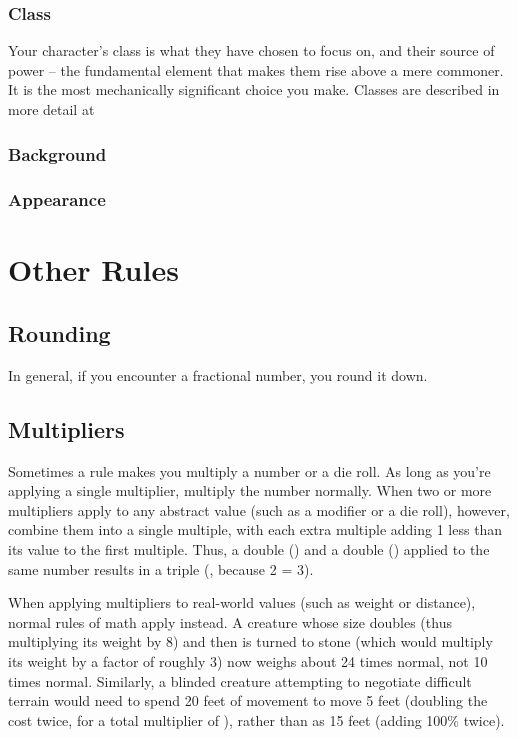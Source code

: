 \subsubsection{Class}
Your character's class is what they have chosen to focus on, and their source of power -- the fundamental element that makes them rise above a mere commoner.
It is the most mechanically significant choice you make.
Classes are described in more detail at 

\subsubsection{Background}

\subsubsection{Appearance}

\section{Other Rules}

\subsection{Rounding}
In general, if you encounter a fractional number, you round it down.

\subsection{Multipliers}
Sometimes a rule makes you multiply a number or a die roll.
As long as you're applying a single multiplier, multiply the number normally.
When two or more multipliers apply to any abstract value (such as a modifier or a die roll), however, combine them into a single multiple, with each extra multiple adding 1 less than its value to the first multiple.
Thus, a double () and a double () applied to the same number results in a triple (, because 2  = 3).

When applying multipliers to real-world values (such as weight or distance), normal rules of math apply instead.
A creature whose size doubles (thus multiplying its weight by 8) and then is turned to stone (which would multiply its weight by a factor of roughly 3) now weighs about 24 times normal, not 10 times normal.
Similarly, a blinded creature attempting to negotiate difficult terrain would need to spend 20 feet of movement to move 5 feet (doubling the cost twice, for a total multiplier of ), rather than as 15 feet (adding 100\% twice).
